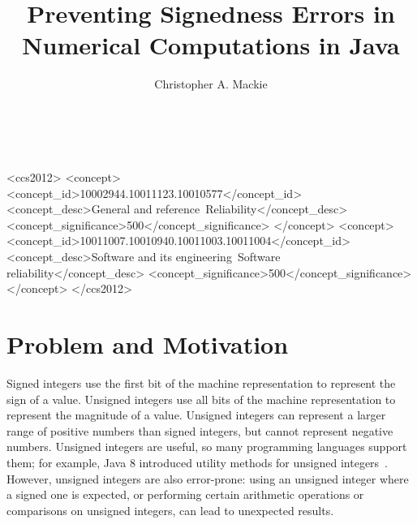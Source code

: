 \documentclass{sig-alternate-05-2015}
\begin{document}
\setlength{\pdfpageheight}{\paperheight}
\setlength{\pdfpagewidth}{\paperwidth}

\title{Preventing Signedness Errors in Numerical Computations in Java}

\author{
Christopher A. Mackie\\
       \\
       \\
}

\maketitle


\begin{CCSXML}
<ccs2012>
<concept>
<concept_id>10002944.10011123.10010577</concept_id>
<concept_desc>General and reference~Reliability</concept_desc>
<concept_significance>500</concept_significance>
</concept>
<concept>
<concept_id>10011007.10010940.10011003.10011004</concept_id>
<concept_desc>Software and its engineering~Software reliability</concept_desc>
<concept_significance>500</concept_significance>
</concept>
</ccs2012>
\end{CCSXML}


\printccsdesc


\section{Problem and Motivation}

Signed integers use the first bit of the machine representation to
represent the sign of a value.  Unsigned integers use all
bits of the machine representation to represent the magnitude of a value.
Unsigned integers can
represent a larger range of positive numbers than signed integers, but
cannot represent negative numbers.
Unsigned integers are useful, so many programming languages support them;
for example, Java 8 introduced utility methods for unsigned
integers~\cite{JDK8UnsignedIntegerArithmetic2012}.  However, unsigned
integers are also
error-prone:  using an unsigned integer where a signed
one is expected, or performing certain arithmetic operations or
comparisons on unsigned integers, can lead to unexpected results.
\end{document}
